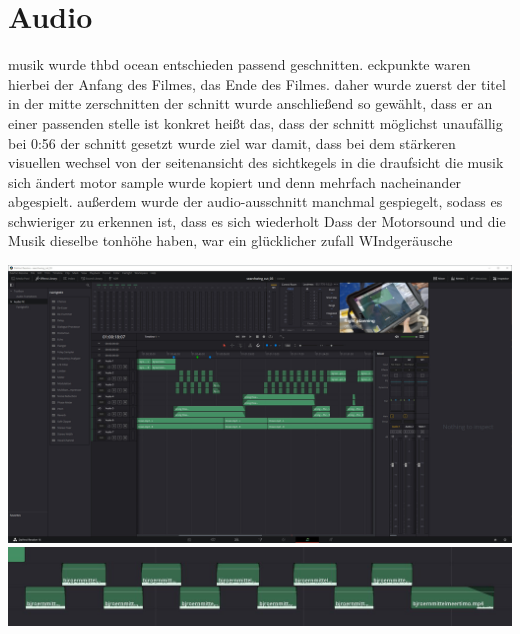 \section{Audio}

musik wurde thbd ocean entschieden
passend geschnitten. eckpunkte waren hierbei der Anfang des Filmes, das Ende des Filmes.
daher wurde zuerst der titel in der mitte zerschnitten
der schnitt wurde anschließend so gewählt, dass er an einer passenden stelle ist
konkret heißt das, dass der schnitt möglichst unaufällig bei 0:56 der schnitt gesetzt wurde
ziel war damit, dass bei dem stärkeren visuellen wechsel von der seitenansicht des sichtkegels in die draufsicht die musik sich ändert
motor sample wurde kopiert und denn mehrfach nacheinander abgespielt. außerdem wurde der audio-ausschnitt manchmal gespiegelt, sodass es schwieriger zu erkennen ist, dass es sich wiederholt
Dass der Motorsound und die Musik dieselbe tonhöhe haben, war ein glücklicher zufall
WIndgeräusche

\includegraphics[width=\textwidth]{gfx/post/resolve1.jpg}
\includegraphics[width=\textwidth]{gfx/post/sample.jpg}